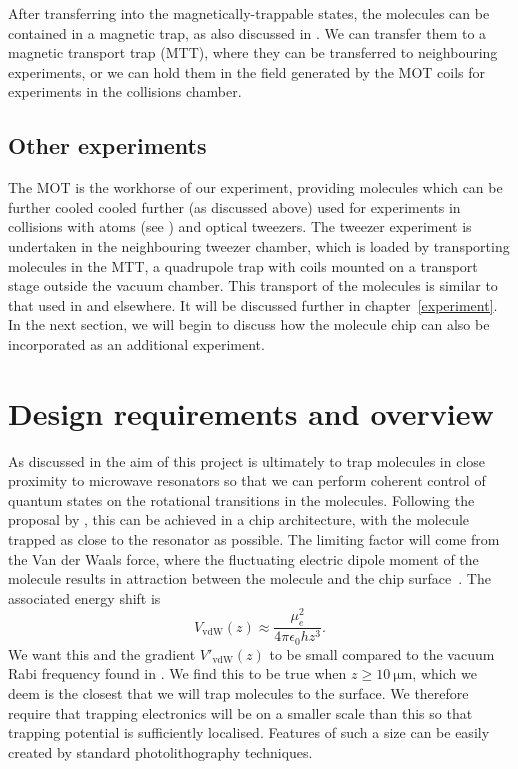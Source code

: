 After transferring into the magnetically-trappable states, the molecules can be
contained in a magnetic trap, as also discussed in
. We can transfer them to a magnetic transport
trap (MTT), where they can be transferred to neighbouring experiments, or we
can hold them in the field generated by the MOT coils for experiments in the
collisions chamber.

\subsection*{Other experiments}

The \CaF{} MOT is the workhorse of our experiment, providing molecules which
can be further cooled cooled further (as discussed above) used for experiments
in collisions with \Rb{} atoms (see ) and optical tweezers. The tweezer experiment is
undertaken in the neighbouring tweezer chamber, which is loaded by transporting
molecules in the MTT, a quadrupole trap with coils mounted on a transport stage
outside the vacuum chamber. This transport of the molecules is similar to that
used in  and elsewhere. It
will be discussed further in chapter~\ref{experiment}. In the next section, we
will begin to discuss how the molecule chip can also be incorporated as an
additional experiment.


\section{Design requirements and overview}

As discussed in  the aim of this project is ultimately to
trap molecules in close proximity to microwave resonators so that we can
perform coherent control of quantum states on the rotational transitions in the
molecules.
%
Following the proposal by , this can be achieved in a chip
architecture, with the molecule trapped as close to the resonator as possible.
%
The limiting factor will come from the Van der Waals force, where the
fluctuating electric dipole moment of the molecule results in attraction
between the molecule and the chip surface~\cite{}. The associated energy
shift is 
%
\begin{equation}
  V_\text{vdW}(z) \approx \frac{\mu_e^2}{4\pi\epsilon_0 h z^3}.
\end{equation}
%
We want this and the gradient $V'_\text{vdW}(z)$ to be small compared to the
vacuum Rabi frequency found in . We find this to
be true when $z\geq\SI{10}{\micro\meter}$, which we deem is the closest that we
will trap molecules to the surface.  We therefore require that trapping
electronics will be on a smaller scale than this so that trapping potential is
sufficiently localised.  Features of such a size can be easily created by
standard photolithography techniques.

